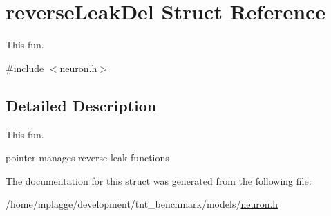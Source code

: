 \hypertarget{structreverse_leak_del}{}\section{reverse\+Leak\+Del Struct Reference}
\label{structreverse_leak_del}


This fun.  




{\ttfamily \#include $<$neuron.\+h$>$}



\subsection{Detailed Description}
This fun. 

pointer manages reverse leak functions 

The documentation for this struct was generated from the following file\+:\begin{DoxyCompactItemize}
\item 
/home/mplagge/development/tnt\+\_\+benchmark/models/\hyperlink{neuron_8h}{neuron.\+h}\end{DoxyCompactItemize}

